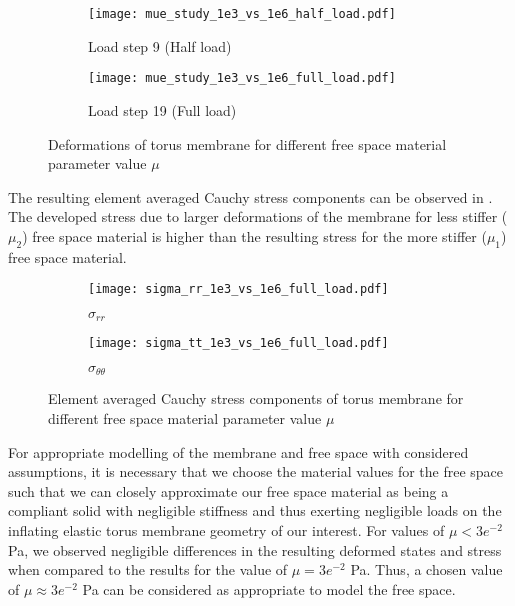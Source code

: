 \begin{figure}[h!]
\centering 
\begin{subfigure}[b]{0.49\textwidth}
\centering
\texttt{[image: mue\_study\_1e3\_vs\_1e6\_half\_load.pdf]}
\caption{Load step 9 (Half load)}
\label{fig:2.12.1}
\end{subfigure}
\begin{subfigure}[b]{0.49\textwidth}
\centering
\texttt{[image: mue\_study\_1e3\_vs\_1e6\_full\_load.pdf]}
\caption{Load step 19 (Full load)}
\label{fig:2.12.2}
\end{subfigure}
\caption{Deformations of torus membrane for different free space material parameter value $\mu$}
\label{fig:2.12}
\end{figure}

The resulting element averaged Cauchy stress components can be observed in . The developed stress due to larger deformations of the membrane for less stiffer ($\mu_2$) free space material is higher than the resulting stress for the more stiffer ($\mu_1$) free space material. \par 

\begin{figure}[h!]
\centering 
\begin{subfigure}[b]{0.49\textwidth}
\centering
\texttt{[image: sigma\_rr\_1e3\_vs\_1e6\_full\_load.pdf]}
\caption{$\sigma_{rr}$}
\label{fig:2.13.1}
\end{subfigure}
\begin{subfigure}[b]{0.49\textwidth}
\centering
\texttt{[image: sigma\_tt\_1e3\_vs\_1e6\_full\_load.pdf]}
\caption{$\sigma_{\theta \theta}$}
\label{fig:2.13.2}
\end{subfigure}
\caption{Element averaged Cauchy stress components of torus membrane for different free space material parameter value $\mu$}
\label{fig:2.13}
\end{figure}

For appropriate modelling of the membrane and free space with considered assumptions, it is necessary that we choose the material values for the free space such that we can closely approximate our free space material as being a compliant solid with negligible stiffness and thus exerting negligible loads on the inflating elastic torus membrane geometry of our interest. For values of $\mu < 3e^{-2}$ Pa, we observed negligible differences in the resulting deformed states and stress when compared to the results for the value of $\mu = 3e^{-2}$ Pa. Thus, a chosen value of $\mu \approx 3e^{-2}$ Pa can be considered as appropriate to model the free space. \par 


